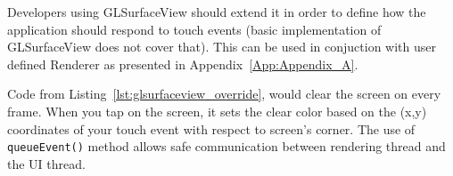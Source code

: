 %

Developers using GLSurfaceView should extend it in order to define how the application should respond to touch events (basic implementation of GLSurfaceView does not cover that). 
This can be used in conjuction with user defined Renderer as presented in Appendix~\ref{App:Appendix_A}. 

%

Code from Listing~\ref{lst:glsurfaceview_override}, would clear the screen on every frame.
When you tap on the screen, it sets the clear color based on the (x,y) coordinates of your touch event with respect to screen's corner.
The use of \texttt{queueEvent()} method allows safe communication between rendering thread and the UI thread.